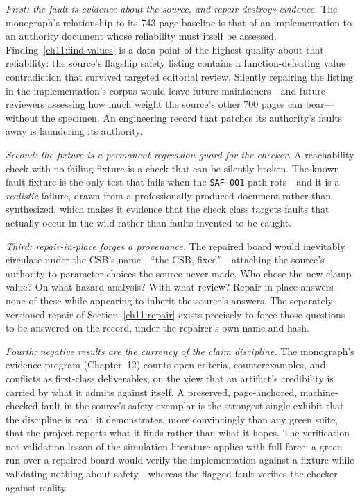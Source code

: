 \emph{First: the fault is evidence about the source, and repair destroys evidence.} The monograph's relationship to its 743-page baseline is that of an implementation to an authority document whose reliability must itself be assessed. Finding~\ref{ch11:find-values} is a data point of the highest quality about that reliability: the source's flagship safety listing contains a function-defeating value contradiction that survived targeted editorial review. Silently repairing the listing in the implementation's corpus would leave future maintainers---and future reviewers assessing how much weight the source's other 700 pages can bear---without the specimen. An engineering record that patches its authority's faults away is laundering its authority.

\emph{Second: the fixture is a permanent regression guard for the checker.} A reachability check with no failing fixture is a check that can be silently broken. The known-fault fixture is the only test that fails when the \texttt{SAF-001} path rots---and it is a \emph{realistic} failure, drawn from a professionally produced document rather than synthesized, which makes it evidence that the check class targets faults that actually occur in the wild rather than faults invented to be caught.

\emph{Third: repair-in-place forges a provenance.} The repaired board would inevitably circulate under the CSB's name---``the CSB, fixed''---attaching the source's authority to parameter choices the source never made. Who chose the new clamp value? On what hazard analysis? With what review? Repair-in-place answers none of these while appearing to inherit the source's answers. The separately versioned repair of Section~\ref{ch11:repair} exists precisely to force those questions to be answered on the record, under the repairer's own name and hash.

\emph{Fourth: negative results are the currency of the claim discipline.} The monograph's evidence program (Chapter~12) counts open criteria, counterexamples, and conflicts as first-class deliverables, on the view that an artifact's credibility is carried by what it admits against itself. A preserved, page-anchored, machine-checked fault in the source's safety exemplar is the strongest single exhibit that the discipline is real: it demonstrates, more convincingly than any green suite, that the project reports what it finds rather than what it hopes. The verification-not-validation lesson of the simulation literature \cite{sargent} applies with full force: a green run over a repaired board would verify the implementation against a fixture while validating nothing about safety---whereas the flagged fault verifies the checker against reality.

